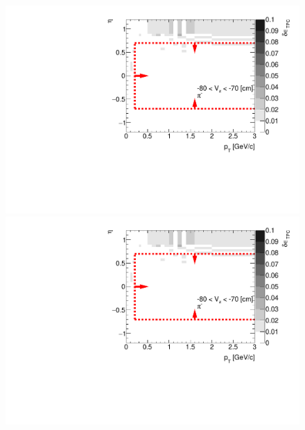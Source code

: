 \begin{figure}[hb]
{		\includegraphics[width=\linewidth,page=9]{graphics/systematicsEfficiency/deadMaterial/secondaries_Unbinned_SDCD_.pdf}\\
		\includegraphics[width=\linewidth,page=12]{graphics/systematicsEfficiency/deadMaterial/secondaries_Unbinned_SDCD_.pdf}
	}%
\end{figure}
